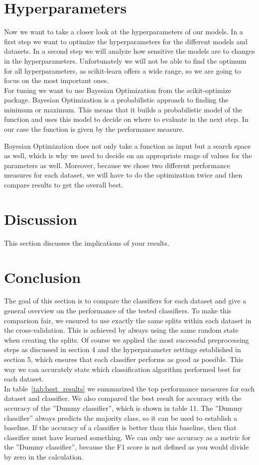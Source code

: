 \documentclass[a4paper,12pt]{article}
\begin{document}
\section{Hyperparameters}
Now we want to take a closer look at the hyperparameters of our models. In a first step we want to optimize the hyperparameters for the different models and datasets.
In a second step we will analyze how sensitive the models are to changes in the hyperparameters. Unfortunately we will not be able to find the optimum for all hyperparameters, as scikit-learn offers a wide range, so we are going to focus on the most important ones.\\

For tuning we want to use Bayesian Optimization from the scikit-optimize package. Bayesian Optimization is a probabilistic approach to finding the minimum or maximum. This means that it builds a probabilistic model of the function and uses this model to decide on where to evaluate in the next step. In our case the function is given by the performance measure. 

Bayesian Optimization does not only take a function as input but a search space as well, which is why we need to decide on an appropriate rnage of values for the parameters as well. Moreover, because we chose two different performance measures for each dataset, we will have to do the optimization twice and then compare results to get the overall best.





\section{Discussion}
This section discusses the implications of your results.

\section{Conclusion}
The goal of this section is to compare the classifiers for each dataset and give a general overview on the
performance of the tested classifiers. To make this comparison fair, we ensured to use exactly the same
splits within each dataset in the cross-validation. This is achieved by always using the same random state
when creating the splits. Of course we applied the most successful preprocessing steps as discussed in
section 4 and the hyperparameter settings established in section 5, which ensures that each classifier
performs as good as possible. This way we can accurately state which classification algorithm performed
best for each dataset.\\
In table~\ref{tab:best_results} we summarized the top performance measures for each dataset and classifier. We also compared
the best result for accuracy with the accuracy of the ”Dummy classifier”, which is shown in table 11.
The ”Dummy classifier” always predicts the majority class, so it can be used to establish a baseline. If
the accuracy of a classifier is better than this baseline, then that classifier must have learned something.
We can only use accuracy as a metric for the ”Dummy classifier”, because the F1 score is not defined as
you would divide by zero in the calculation.
\end{document}
